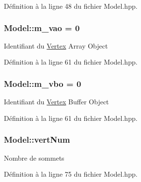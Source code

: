 Définition à la ligne 48 du fichier Model.\+hpp.

\hypertarget{classModel_acba5e05b4023cae6c5650ae839fb009f}{
\subsubsection[{m\+\_\+vao}]{\setlength{\rightskip}{0pt plus 5cm}Model\+::m\+\_\+vao = 0\hspace{0.3cm}{\ttfamily [protected]}}}\label{classModel_acba5e05b4023cae6c5650ae839fb009f}
{\ttfamily Identifiant} du \hyperlink{structVertex}{Vertex} Array Object 

Définition à la ligne 61 du fichier Model.\+hpp.

\hypertarget{classModel_a76ec368b072bc97855bd860d9eaf879b}{
\subsubsection[{m\+\_\+vbo}]{\setlength{\rightskip}{0pt plus 5cm}Model\+::m\+\_\+vbo = 0\hspace{0.3cm}{\ttfamily [protected]}}}\label{classModel_a76ec368b072bc97855bd860d9eaf879b}
{\ttfamily Identifiant} du \hyperlink{structVertex}{Vertex} Buffer Object 

Définition à la ligne 61 du fichier Model.\+hpp.

\hypertarget{classModel_a2e6cb8d2533906b5b67ff6e46979b6ba}{
\subsubsection[{vert\+Num}]{\setlength{\rightskip}{0pt plus 5cm}Model\+::vert\+Num\hspace{0.3cm}{\ttfamily [protected]}}}\label{classModel_a2e6cb8d2533906b5b67ff6e46979b6ba}
{\ttfamily Nombre} de sommets 

Définition à la ligne 75 du fichier Model.\+hpp.

